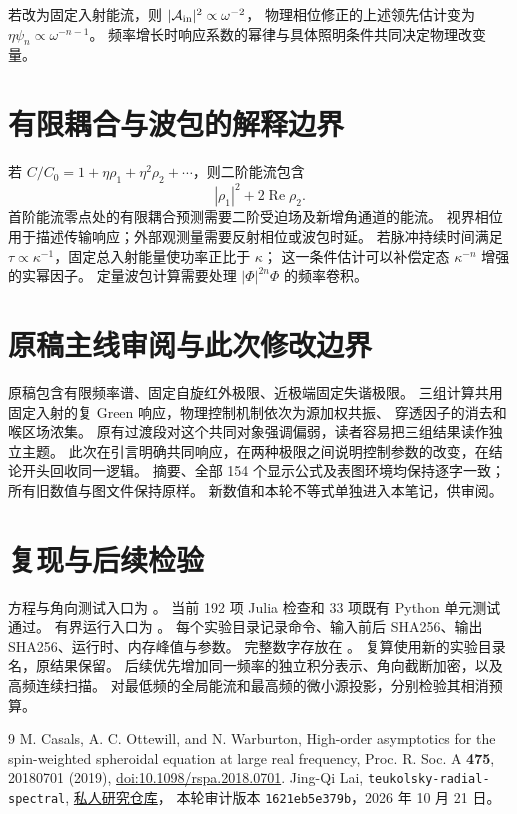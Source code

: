 \documentclass[UTF8,fontset=fandol,11pt,a4paper]{ctexart}
\newcommand{\Rea}{\operatorname{Re}}\newcommand{\Ima}{\operatorname{Im}}
\numberwithin{equation}{section}
\begin{document}
若改为固定入射能流，则 $|\mathcal A_{\rm in}|^2\propto\omega^{-2}$，
物理相位修正的上述领先估计变为 $\eta\psi_n\propto\omega^{-n-1}$。
频率增长时响应系数的幂律与具体照明条件共同决定物理改变量。

\section{有限耦合与波包的解释边界}
若 $C/C_0=1+\eta\rho_1+\eta^2\rho_2+\cdots$，则二阶能流包含
\begin{equation}
|\rho_1|^2+2\Rea\rho_2.
\end{equation}
首阶能流零点处的有限耦合预测需要二阶受迫场及新增角通道的能流。
视界相位用于描述传输响应；外部观测量需要反射相位或波包时延。
若脉冲持续时间满足 $\tau\propto\kappa^{-1}$，固定总入射能量使功率正比于 $\kappa$；
这一条件估计可以补偿定态 $\kappa^{-n}$ 增强的实幂因子。
定量波包计算需要处理 $|\Phi|^{2n}\Phi$ 的频率卷积。

\section{原稿主线审阅与此次修改边界}
原稿包含有限频率谱、固定自旋红外极限、近极端固定失谐极限。
三组计算共用固定入射的复 Green 响应，物理控制机制依次为源加权共振、
穿透因子的消去和喉区场浓集。
原有过渡段对这个共同对象强调偏弱，读者容易把三组结果读作独立主题。
此次在引言明确共同响应，在两种极限之间说明控制参数的改变，在结论开头回收同一逻辑。
摘要、全部 154 个显示公式及表图环境均保持逐字一致；所有旧数值与图文件保持原样。
新数值和本轮不等式单独进入本笔记，供审阅。

\section{复现与后续检验}
方程与角向测试入口为 。
当前 192 项 Julia 检查和 33 项既有 Python 单元测试通过。
有界运行入口为 。
每个实验目录记录命令、输入前后 SHA256、输出 SHA256、运行时、内存峰值与参数。
完整数字存放在 。
复算使用新的实验目录名，原结果保留。
后续优先增加同一频率的独立积分表示、角向截断加密，以及高频连续扫描。
对最低频的全局能流和最高频的微小源投影，分别检验其相消预算。
\begin{thebibliography}{9}
 M. Casals, A. C. Ottewill, and N. Warburton,
High-order asymptotics for the spin-weighted spheroidal equation at large real frequency,
Proc. R. Soc. A \textbf{475}, 20180701 (2019),
\href{https://doi.org/10.1098/rspa.2018.0701}{doi:10.1098/rspa.2018.0701}.
 Jing-Qi Lai, \texttt{teukolsky-radial-spectral},
\href{https://github.com/ljq2088/teukolsky-radial-spectral}{私人研究仓库}，
本轮审计版本 \texttt{1621eb5e379b}，2026 年 10 月 21 日。
\end{thebibliography}
\end{document}
